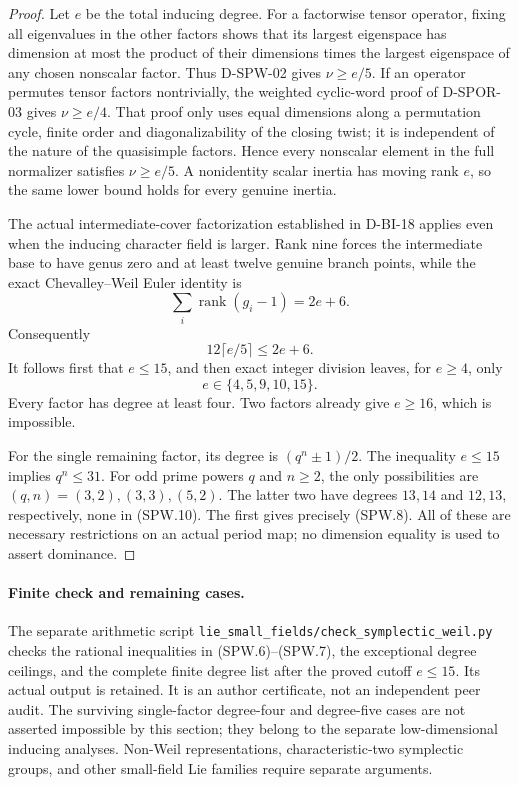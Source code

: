 \begin{proof}
Let $e$ be the total inducing degree.  For a factorwise tensor
operator, fixing all eigenvalues in the other factors shows
that its largest eigenspace has dimension at most the product
of their dimensions times the largest eigenspace of any chosen
nonscalar factor.  Thus D-SPW-02 gives $\nu\ge e/5$.
If an operator permutes tensor factors nontrivially, the weighted
cyclic-word proof of D-SPOR-03 gives $\nu\ge e/4$.
That proof only uses equal dimensions along a permutation cycle,
finite order and diagonalizability of the closing twist; it is
independent of the nature of the quasisimple factors.  Hence
every nonscalar element in the full normalizer satisfies
$\nu\ge e/5$.  A nonidentity scalar inertia has moving rank $e$,
so the same lower bound holds for every genuine inertia.

The actual intermediate-cover factorization established in
D-BI-18 applies even when the inducing character field is larger.
Rank nine forces the intermediate base to have genus zero and
at least twelve genuine branch points, while the exact
Chevalley--Weil Euler identity is
\[
             \sum_i\operatorname{rank}(g_i-1)=2e+6.
\]
Consequently
\[
                   12\lceil e/5\rceil\le2e+6.             \tag{SPW.9}
\]
It follows first that $e\le15$, and then exact integer division
leaves, for $e\ge4$, only
\[
                              e\in\{4,5,9,10,15\}.         \tag{SPW.10}
\]
Every factor has degree at least four.  Two factors already
give $e\ge16$, which is impossible.

For the single remaining factor, its degree is $(q^n\pm1)/2$.
The inequality $e\le15$ implies $q^n\le31$.
For odd prime powers $q$ and $n\ge2$, the only possibilities
are $(q,n)=(3,2),(3,3),(5,2)$.
The latter two have degrees $13,14$ and $12,13$, respectively,
none in (SPW.10).  The first gives precisely (SPW.8).
All of these are necessary restrictions on an actual period
map; no dimension equality is used to assert dominance.
\end{proof}

\paragraph{Finite check and remaining cases.}
The separate arithmetic script
\texttt{lie\_small\_fields/check\_symplectic\_weil.py} checks
the rational inequalities in (SPW.6)--(SPW.7), the exceptional
degree ceilings, and the complete finite degree list after the
proved cutoff $e\le15$.  Its actual output is retained.
It is an author certificate, not an independent peer audit.
The surviving single-factor degree-four and degree-five cases
are not asserted impossible by this section; they belong to the
separate low-dimensional inducing analyses.  Non-Weil
representations, characteristic-two symplectic groups, and
other small-field Lie families require separate arguments.

